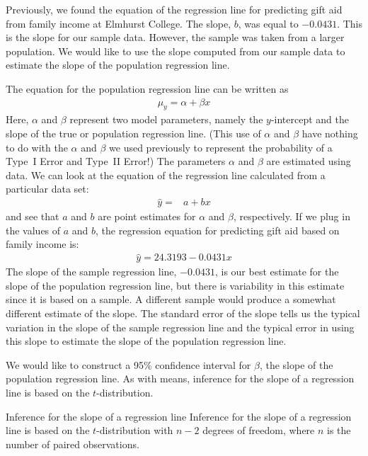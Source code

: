Previously, we found the equation of the regression line for predicting gift aid from family income at Elmhurst College.  The slope, $b$, was equal to $-0.0431$.  This is the slope for our sample data.  However, the sample was taken from a larger population.   We would like to use the slope computed from our sample data to estimate the slope of the population regression line.

The equation for the population regression line can be written as
\begin{align*}
\mu_y = \alpha + \beta x
\end{align*}
Here, $\alpha$ and $\beta$ represent two model parameters, namely the $y$-intercept and the slope of the true or population regression line. (This use of $\alpha$ and $\beta$ have nothing to do with the $\alpha$ and $\beta$ we used previously to represent the probability of a Type~I Error and Type~II Error!) The parameters $\alpha$ and $\beta$ are estimated using data.  We can look at the equation of the regression line calculated from a particular data set:
\begin{align*}
\hat{y} =& a  + bx 
\end{align*}
and see that $a$ and $b$ are point estimates for $\alpha$ and $\beta$, respectively.  
If we plug in the values of $a$ and $b$, the regression equation for predicting gift aid based on family income is:
\begin{align*}
\hat{y}=24.3193-0.0431x
\end{align*}
The slope of the sample regression line, $-0.0431$, is our best estimate for the slope of the population regression line, but there is variability in this estimate since it is based on a sample.  A different sample would produce a somewhat different estimate of the slope.  The standard error of the slope tells us the typical variation in the slope of the sample regression line and the typical error in using this slope to estimate the slope of the population regression line.  

We would like to construct a 95\% confidence interval for $\beta$, the slope of the population regression line. As with means, inference for the slope of a regression line is based on the $t$-distribution.



\begin{onebox}
{Inference for the slope of a regression line}
Inference for the slope of a regression line is based on the $t$-distribution with $n-2$ degrees of freedom, where $n$ is the number of paired observations.
\end{onebox}

